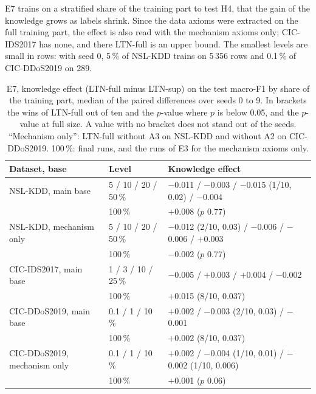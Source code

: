 E7 trains on a stratified share of the training part to test H4, that the gain of the knowledge grows as labels
shrink. Since the data axioms were extracted on the full training part, the effect is also read with the mechanism
axioms only; CIC-IDS2017 has none, and there LTN-full is an upper bound. The smallest levels are small in rows: with seed 0, 5\,\% of
NSL-KDD trains on 5\,356 rows and 0.1\,\% of CIC-DDoS2019 on 289.

\begin{table}[t]
\centering
\footnotesize
\caption{E7, knowledge effect (LTN-full minus LTN-sup) on the test macro-F1 by share of the training part, median
of the paired differences over seeds 0 to 9. In brackets the wins of LTN-full out of ten and the $p$-value where $p$
is below 0.05, and the $p$-value at full size. A value with no bracket does not stand out of the seeds.
``Mechanism only'': LTN-full without A3 on NSL-KDD and without A2 on CIC-DDoS2019. 100\,\%: final runs, and the
runs of E3 for the mechanism axioms only.}
\label{tab:res-e7}
\setlength{\tabcolsep}{3pt}
\begin{tabular}{@{}p{3.3cm}p{2.0cm}p{7.6cm}@{}}
\toprule
Dataset, base & Level & Knowledge effect \\
\midrule
NSL-KDD, main base     & 5 / 10 / 20 / 50\,\% & $-$0.011 / $-$0.003 / $-$0.015 (1/10, 0.02) / $-$0.004 \\
                       & 100\,\%              & $+$0.008 ($p$ 0.77) \\
NSL-KDD, mechanism only & 5 / 10 / 20 / 50\,\% & $-$0.012 (2/10, 0.03) / $-$0.006 / $-$0.006 / $+$0.003 \\
                       & 100\,\%              & $-$0.002 ($p$ 0.77) \\
CIC-IDS2017, main base & 1 / 3 / 10 / 25\,\%  & $-$0.005 / $+$0.003 / $+$0.004 / $-$0.002 \\
                       & 100\,\%              & $+$0.015 (8/10, 0.037) \\
CIC-DDoS2019, main base & 0.1 / 1 / 10\,\%    & $+$0.002 / $-$0.003 (2/10, 0.03) / $-$0.001 \\
                       & 100\,\%              & $+$0.002 (8/10, 0.037) \\
CIC-DDoS2019, mechanism only & 0.1 / 1 / 10\,\% & $+$0.002 / $-$0.004 (1/10, 0.01) / $-$0.002 (1/10, 0.006) \\
                       & 100\,\%              & $+$0.001 ($p$ 0.06) \\
\bottomrule
\end{tabular}
\end{table}

